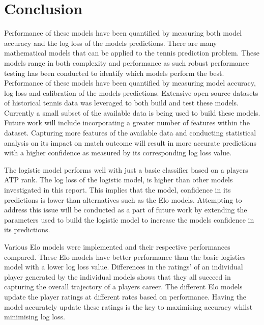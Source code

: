 \documentclass[12pt,a4paper]{article}
\begin{document}
\section{Conclusion}
Performance of these models have been quantified by measuring both
model accuracy and the log loss of the models predictions. There are many mathematical models that can be applied to the tennis prediction problem.
These models range in both complexity and performance as such robust performance testing
has been conducted to identify which models perform the best. Performance of these models
have been quantified by measuring model accuracy, log loss and calibration of the models
predictions. Extensive open-source datasets of historical tennis data was leveraged to
both build and test these models. Currently a small subset of the available data is being
used to build these models. Future work will include incorporating a greater number of
features within the dataset. Capturing more features of the available data and conducting
statistical analysis on its impact on match outcome will result in more accurate predictions
with a higher confidence as measured by its corresponding log loss value.

The logistic model performs well with just a basic classifier based on a
players ATP rank. The log loss of the logistic model, is higher than other models
investigated in this report. This implies that the model,
confidence in its predictions is lower than alternatives such as the Elo models.
Attempting to address this issue will be conducted as a part of future work by
extending the parameters used to build the logistic model to increase the models
confidence in its predictions.

Various Elo models were implemented and their respective performances compared. These Elo
models have better performance than the basic logistics model with a
lower log loss value. Differences in the ratings' of an individual player
generated by the individual models shows that they all succeed in capturing the overall
trajectory of a players career. The different Elo models update the player ratings at
different rates based on performance. Having the model accurately update these ratings
is the key to maximising accuracy whilst minimising log loss.

\clearpage




\vspace{10mm}
\noindent \hrulefill
\end{document}
